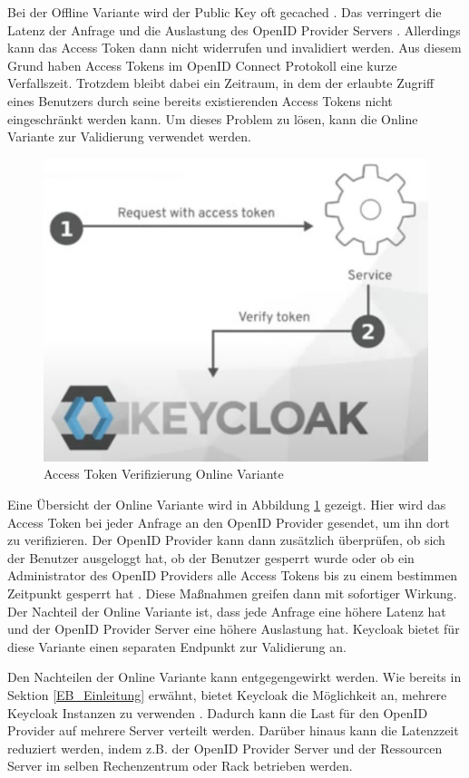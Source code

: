 Bei der Offline Variante wird der Public Key oft gecached \cite{EB32}. Das verringert die Latenz der Anfrage und die Auslastung des OpenID Provider Servers \cite{EB32}. Allerdings kann das Access Token dann nicht widerrufen und invalidiert werden. Aus diesem Grund haben Access Tokens im OpenID Connect Protokoll eine kurze Verfallszeit. Trotzdem bleibt dabei ein Zeitraum, in dem der erlaubte Zugriff eines Benutzers durch seine bereits existierenden Access Tokens nicht eingeschränkt werden kann. Um dieses Problem zu lösen, kann die Online Variante zur Validierung verwendet werden. %

\begin{figure}[!ht]
	\centering
	\includegraphics[width=.6\textwidth]{Images/EbertScherer/VerifyAccessTokenOnline.PNG}
	\caption{Access Token Verifizierung Online Variante \cite{EB32}}
	\label{fig:EB_Access Token Verifizierung Online Variante}
\end{figure}

Eine Übersicht der Online Variante wird in Abbildung \ref{fig:EB_Access Token Verifizierung Online Variante} gezeigt. Hier wird das Access Token bei jeder Anfrage an den OpenID Provider gesendet, um ihn dort zu verifizieren. Der OpenID Provider kann dann zusätzlich überprüfen, ob sich der Benutzer ausgeloggt hat, ob der Benutzer gesperrt wurde oder ob ein Administrator des OpenID Providers alle Access Tokens bis zu einem bestimmen Zeitpunkt gesperrt hat \cite{EB32}. Diese Maßnahmen greifen dann mit sofortiger Wirkung. Der Nachteil der Online Variante ist, dass jede Anfrage eine höhere Latenz hat und der OpenID Provider Server eine höhere Auslastung hat. Keycloak bietet für diese Variante einen separaten Endpunkt zur Validierung an. 

Den Nachteilen der Online Variante kann entgegengewirkt werden. Wie bereits in Sektion \ref{EB_Einleitung} erwähnt, bietet Keycloak die Möglichkeit an, mehrere Keycloak Instanzen zu verwenden \cite{EB33}. Dadurch kann die Last für den OpenID Provider auf mehrere Server verteilt werden. Darüber hinaus kann die Latenzzeit reduziert werden, indem z.B. der OpenID Provider Server und der Ressourcen Server im selben Rechenzentrum oder Rack betrieben werden.


